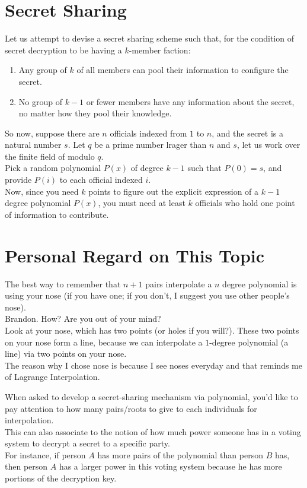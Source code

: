 \section{Secret Sharing}
Let us attempt to devise a secret sharing scheme such that, for the condition of secret decryption to be having a $k$-member faction:
\begin{enumerate}
    \item Any group of $k$ of all members can pool their information to configure the secret.
    \item No group of $k - 1$ or fewer members have any information about the secret, no matter how they pool their knowledge.
\end{enumerate}
So now, suppose there are $n$ officials indexed from $1$ to $n$, and the secret is a natural number $s$. Let $q$ be a prime number lrager than $n$ and $s$, let us work over the finite field of modulo $q$. \\
Pick a random polynomial $P(x)$ of degree $k - 1$ such that $P(0) = s$, and provide $P(i)$ to each official indexed $i$. \\
Now, since you need $k$ points to figure out the explicit expression of a $k - 1$ degree polynomial $P(x)$, you must need at least $k$ officials who hold one point of information to contribute.

\section{Personal Regard on This Topic}
The best way to remember that $n + 1$ pairs interpolate a $n$ degree polynomial is using your nose (if you have one; if you don't, I suggest you use other people's nose). \\
Brandon. How? Are you out of your mind? \\
Look at your nose, which has two points (or holes if you will?). These two points on your nose form a line, because we can interpolate a $1$-degree polynomial (a line) via two points on your nose. \\
The reason why I chose nose is because I see noses everyday and that reminds me of Lagrange Interpolation.

When asked to develop a secret-sharing mechanism via polynomial, you'd like to pay attention to how many pairs/roots to give to each individuals for interpolation. \\
This can also associate to the notion of how much power someone has in a voting system to decrypt a secret to a specific party. \\
For instance, if person $A$ has more pairs of the polynomial than person $B$ has, then person $A$ has a larger power in this voting system because he has more portions of the decryption key.

